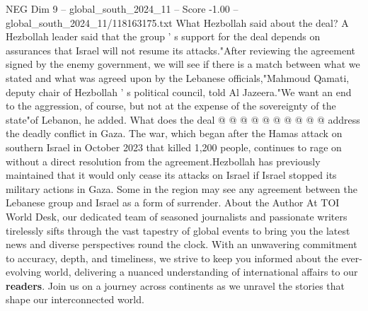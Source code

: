 \begin{textsample}{NEG Dim 9 – global\_south\_2024\_11 – Score -1.00 – global\_south\_2024\_11/118163175.txt}
What Hezbollah said about the deal?
A Hezbollah leader said that the group ' s support for the deal depends on assurances that Israel will not resume its attacks."After reviewing the agreement signed by the enemy government, we will see if there is a match between what we stated and what was agreed upon by the Lebanese officials,"Mahmoud Qamati, deputy chair of Hezbollah ' s political council, told Al Jazeera."We want an end to the aggression, of course, but not at the expense of the sovereignty of the state"of Lebanon, he added.
What does the deal @ @ @ @ @ @ @ @ @ @ address the deadly conflict in Gaza.
The war, which began after the Hamas attack on southern Israel in October 2023 that killed 1,200 people, continues to rage on without a direct resolution from the agreement.Hezbollah has previously maintained that it would only cease its attacks on Israel if Israel stopped its military actions in Gaza.
Some in the region may see any agreement between the Lebanese group and Israel as a form of surrender.
About the Author At TOI World Desk, our dedicated team of seasoned journalists and passionate writers tirelessly sifts through the vast tapestry of global events to bring you the latest news and diverse perspectives round the clock.
With an unwavering commitment to accuracy, depth, and timeliness, we strive to keep you informed about the ever-evolving world, delivering a nuanced understanding of international affairs to our \textbf{readers}.
Join us on a journey across continents as we unravel the stories that shape our interconnected world.

\end{textsample}
